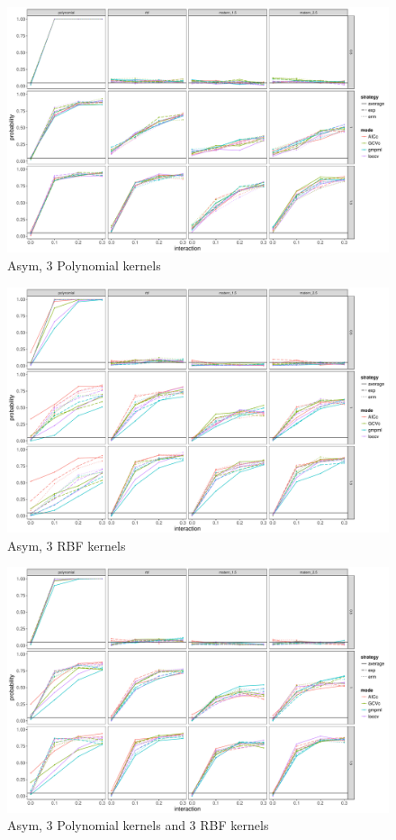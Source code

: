 \documentclass[article]{jss}
\begin{document}
\begin{figure}
\begin{center}
\includegraphics[width=0.9\columnwidth]{A2} 
\caption{Asym, 3 Polynomial kernels}
\label{fig:res}
\end{center}
\end{figure}

\begin{figure}
\begin{center}
\includegraphics[width=0.9\columnwidth]{A3} 
\caption{Asym, 3 RBF kernels}
\label{fig:res}
\end{center}
\end{figure}

\begin{figure}
\begin{center}
\includegraphics[width=0.9\columnwidth]{A4} 
\caption{Asym, 3 Polynomial kernels and 3 RBF kernels}
\label{fig:res}
\end{center}
\end{figure}
\end{document}
